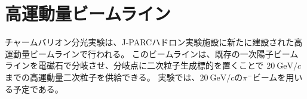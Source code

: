 \section{高運動量ビームライン}
チャームバリオン分光実験は、J-PARCハドロン実験施設に新たに建設された高運動量ビームラインで行われる。
このビームラインは、既存の一次陽子ビームラインを電磁石で分岐させ、分岐点に二次粒子生成標的を置くことで
$\SI{20}{\GeV / c}$までの高運動量二次粒子を供給できる。
実験では、$\SI{20}{\GeV / c}$の$\pi^-$ビームを用いる予定である。
